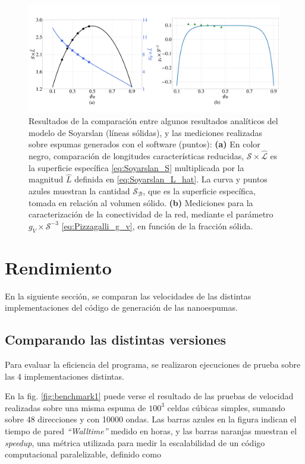 \documentclass{article}
\begin{document}
\begin{figure}[H]
    \centering
    \includegraphics[width=\textwidth]{figs/Soyarslan_2Plots.jpg}
    \caption{Resultados de la comparación entre algunos resultados analíticos del modelo de Soyarslan (líneas sólidas), y las mediciones realizadas sobre espumas generados con el software (puntos): \textbf{(a)} En color negro, comparación de longitudes características reducidas, $\mathcal{S\times\hat{L}}$ es la superficie específica \eqref{eq:Soyarslan_S} multiplicada por la magnitud $\hat{L}$ definida en \eqref{eq:Soyarslan_L_hat}. La curva y puntos azules muestran la cantidad $\mathcal{S_B}$, que es la superficie específica, tomada en relación al volumen sólido. \textbf{(b)} Mediciones para la caracterización de la conectividad de la red, mediante el parámetro $g_V\times\mathcal{S}^{-3}$ \eqref{eq:Pizzagalli_g_v}, en función de la fracción sólida.}
    \label{fig:Soyarslan_2plots}
\end{figure}

\section{Rendimiento} \label{sec:4.1.3}

En la siguiente sección, se comparan las velocidades de las distintas implementaciones del código de generación de las nanoespumas. 

\subsection{Comparando las distintas versiones}
Para evaluar la eficiencia del programa, se realizaron ejecuciones de prueba sobre las 4 implementaciones distintas. 

En la fig. \ref{fig:benchmark1} puede verse el resultado de las pruebas de velocidad realizadas sobre una misma espuma de $100^3$ celdas cúbicas simples, sumando sobre 48 direcciones y con 10000 ondas. Las barras azules en la figura indican el tiempo de pared \textit{``Walltime''} medido en horas, y las barras naranjas muestran el \textit{speedup}, una métrica utilizada para medir la escalabilidad de un código computacional paralelizable, definido como
\end{document}
